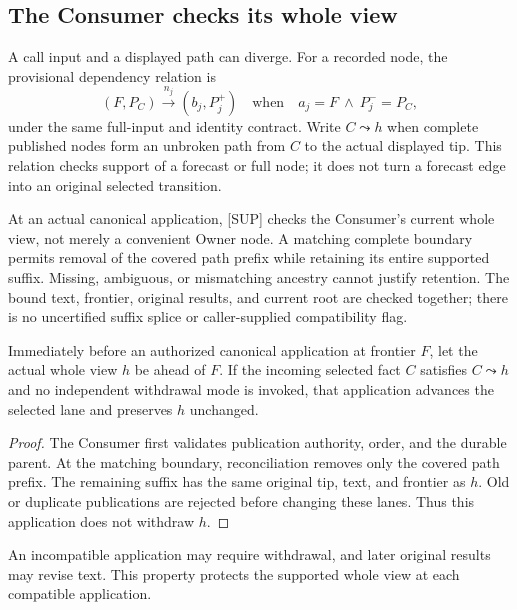\subsection{The Consumer checks its whole view}
A call input and a displayed path can diverge. For a recorded node,
the provisional dependency relation is
\begin{equation}
 (F,P_C)\xrightarrow{n_j}(b_j,P_j^+)
 \quad\text{when}\quad a_j=F\ \land\ P_j^-=P_C,
 \label{eq:edge}
\end{equation}
under the same full-input and identity contract. Write $C\leadsto h$
when complete published nodes form an unbroken path from $C$ to the
actual displayed tip. This relation checks support of a forecast or
full node; it does not turn a forecast edge into an original selected
transition.

At an actual canonical application, [SUP] checks the Consumer's current
whole view, not merely a convenient Owner node. A matching complete
boundary permits removal of the covered path prefix while retaining its
entire supported suffix. Missing, ambiguous, or mismatching ancestry
cannot justify retention. The bound text, frontier, original results,
and current root are checked together; there is no uncertified suffix
splice or caller-supplied compatibility flag.

\begin{proposition}
\label{prop:continuity}
Immediately before an authorized canonical application at frontier $F$,
let the actual whole view $h$ be ahead of $F$. If the incoming selected
fact $C$ satisfies $C\leadsto h$ and no independent withdrawal mode is
invoked, that application advances the selected lane and preserves $h$
unchanged.
\end{proposition}
\begin{proof}
The Consumer first validates publication authority, order, and the
durable parent. At the matching boundary, reconciliation removes only
the covered path prefix. The remaining suffix has the same original tip,
text, and frontier as $h$. Old or duplicate publications are rejected
before changing these lanes. Thus this application does not withdraw
$h$.
\end{proof}

An incompatible application may require withdrawal, and later original
results may revise text. This property protects the supported whole view
at each compatible application.

